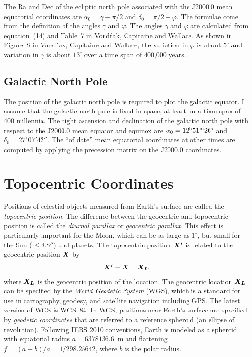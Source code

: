\documentclass[12pt]{article}
\newcommand \beq {\begin{equation}}
\newcommand \eeq {\end{equation}}
\newcommand{\ve}[1]{\mbox{\boldmath $#1$}}
\begin{document}
The Ra and Dec of the ecliptic north pole associated with the J2000.0 mean 
equatorial coordinates are $\alpha_0 = \gamma-\pi/2$ and $\delta_0=\pi/2 - \varphi$. 
The formulae come from the definition of the angles $\gamma$ and $\varphi$. 
The angles $\gamma$ and $\varphi$ are calculated from equation~(14) and Table~7 in 
\href{http://adsabs.harvard.edu/abs/2011A%26A...534A..22V}{Vond\'rak,
Capitaine and Wallace}. As shown in Figure~8 in 
\href{http://adsabs.harvard.edu/abs/2011A%26A...534A..22V}{Vond\'rak,
Capitaine and Wallace}, the variation in $\varphi$ is about $5^\circ$ and variation in 
$\gamma$ is about $13^\circ$ over a time span of 400,000 years.

\subsection{Galactic North Pole} 

The position of the galactic north pole is required to plot the galactic 
equator. I assume that the galactic north pole is fixed in space, at 
least on a time span of 400 millennia. The right ascension and declination 
of the galactic north pole with respect to the J2000.0 mean equator and equinox 
are $\alpha_0 = 12^{\rm h} 51^{\rm m} 26^{\rm s}$ and $\delta_0 = 27^\circ 07' 
42''$. The ``of date'' mean equatorial coordinates at other times are computed 
by applying the precession matrix on the J2000.0 coordinates.

\section{Topocentric Coordinates}

Positions of celestial objects measured from Earth's surface are called 
the {\em topocentric position}. The difference between the geocentric 
and topocentric position is called the {\em diurnal parallax} or 
{\em geocentric parallax}. This effect is particularly important for the Moon, 
which can be as large as $1^\circ$, but small for the Sun ($\leq 8.8''$) and planets. 
The topocentric position $\ve{X'}$ is related to the geocentric position $\ve{X}$ by 
\beq
  \ve{X'} = \ve{X} - \ve{X_L} ,
\label{eq:topoX}
\eeq
where $\ve{X_L}$ is the geocentric position of the location. The geocentric 
location $\ve{X_L}$ can be specified by the 
\href{https://en.wikipedia.org/wiki/World_Geodetic_System}{\em World Geodetic System} (WGS), 
which is a standard for use in cartography, geodesy, and satellite navigation including GPS. 
The latest version of WGS is WGS~84. 
In WGS, positions near Earth's surface are specified by {\em geodetic coordinates} 
that are referred to a reference spheroid (an ellipse of revolution). Following 
\href{https://www.iers.org/IERS/EN/Publications/TechnicalNotes/tn36.html}{IERS 2010 
conventions}, Earth is modeled as a spheroid with equatorial radius $a=6378136.6$~m 
and flattening $f=(a-b)/a=1/298.25642$, where $b$ is the polar radius.
\end{document}
